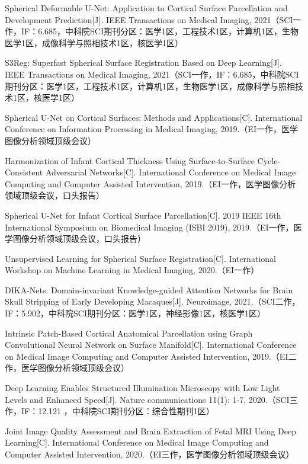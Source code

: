 \cleardoublepage
{}


\noindent [1] Spherical Deformable U-Net: Application to Cortical Surface Parcellation and Development Prediction[J]. IEEE Transactions on Medical Imaging, 2021（SCI一作，IF：6.685，中科院SCI期刊分区：医学1区，工程技术1区，计算机1区，生物医学1区，成像科学与照相技术1区，核医学1区）

\noindent [2] S3Reg: Superfast Spherical Surface Registration Based on Deep Learning[J]. IEEE Transactions on Medical Imaging, 2021（SCI一作，IF：6.685，中科院SCI期刊分区：医学1区，工程技术1区，计算机1区，生物医学1区，成像科学与照相技术1区，核医学1区）

\noindent [3] Spherical U-Net on Cortical Surfaces: Methods and Applications[C]. International Conference on Information Processing in Medical Imaging, 2019.（EI一作，医学图像分析领域顶级会议）

\noindent [4] Harmonization of Infant Cortical Thickness Using Surface-to-Surface Cycle-Consistent Adversarial Networks[C]. International Conference on Medical Image Computing and Computer Assisted Intervention, 2019.（EI一作，医学图像分析领域顶级会议，口头报告）

\noindent [5] Spherical U-Net for Infant Cortical Surface Parcellation[C]. 2019 IEEE 16th International Symposium on Biomedical Imaging (ISBI 2019), 2019.（EI一作，医学图像分析领域顶级会议，口头报告）

\noindent [6] Unsupervised Learning for Spherical Surface Registration[C]. International Workshop on Machine Learning in Medical Imaging, 2020.（EI一作）

\noindent [7] DIKA-Nets: Domain-invariant Knowledge-guided Attention Networks for Brain Skull Stripping of Early Developing Macaques[J]. Neuroimage, 2021.（SCI二作，IF：5.902，中科院SCI期刊分区：医学1区，神经影像1区，核医学1区） 

\noindent [8] Intrinsic Patch-Based Cortical Anatomical Parcellation using Graph Convolutional Neural Network on Surface Manifold[C]. International Conference on Medical Image Computing and Computer Assisted Intervention, 2019.（EI二作，医学图像分析领域顶级会议）

\noindent [9] Deep Learning Enables Structured Illumination Microscopy with Low Light Levels and Enhanced Speed[J]. Nature communications 11(1): 1-7, 2020.（SCI三作，IF：12.121 ，中科院SCI期刊分区：综合性期刊1区）

\noindent [10] Joint Image Quality Assessment and Brain Extraction of Fetal MRI Using Deep Learning[C]. International Conference on Medical Image Computing and Computer Assisted Intervention, 2020.（EI三作，医学图像分析领域顶级会议）

